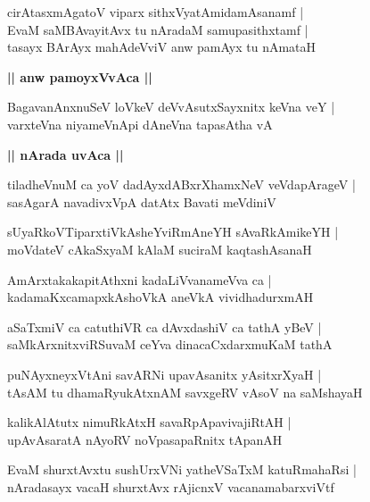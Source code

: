 \documentclass[twoside,12pt,openright]{book}
\newcounter{shloka}[chapter]
\def\uvaca#1{\centerline{{\large\textbf{#1}}}}
\begin{document}
\begin{shloka}
cirAtasxmAgatoV viparx sithxVyatAmidamAsanamf |\\
EvaM saMBAvayitAvx tu nAradaM samupasithxtamf |\\
tasayx BArAyx mahAdeVviV anw pamAyx tu nAmataH 
\end{shloka}

\uvaca{|| anw pamoyxVvAca ||}

\begin{shloka}
BagavanAnxnuSeV loVkeV deVvAsutxSayxnitx keVna veY |\\
varxteVna niyameVnApi dAneVna tapasAtha vA
\end{shloka}

\uvaca{|| nArada uvAca ||}

\begin{shloka}
tiladheVnuM ca yoV dadAyxdABxrXhamxNeV veVdapArageV |\\
sasAgarA navadivxVpA datAtx Bavati meVdiniV 
\end{shloka}

\begin{shloka}
sUyaRkoVTiparxtiVkAsheYviRmAneYH sAvaRkAmikeYH |\\
moVdateV cAkaSxyaM kAlaM suciraM kaqtashAsanaH
\end{shloka}

\begin{shloka}
AmArxtakakapitAthxni kadaLiVvanameVva ca |\\
kadamaKxcamapxkAshoVkA aneVkA vividhadurxmAH 
\end{shloka}

\begin{shloka}
aSaTxmiV ca catuthiVR ca dAvxdashiV ca tathA yBeV |\\
saMkArxnitxviRSuvaM ceYva dinacaCxdarxmuKaM tathA
\end{shloka}

\begin{shloka}
puNAyxneyxVtAni savARNi upavAsanitx yAsitxrXyaH |\\
tAsAM tu dhamaRyukAtxnAM savxgeRV vAsoV na saMshayaH 
\end{shloka}

\begin{shloka}
kalikAlAtutx nimuRkAtxH savaRpApavivajiRtAH |\\
upAvAsaratA nAyoRV noVpasapaRnitx tApanAH
\end{shloka}

\begin{shloka}
EvaM shurxtAvxtu sushUrxVNi yatheVSaTxM katuRmahaRsi |\\
nAradasayx vacaH shurxtAvx rAjicnxV vacanamabarxviVtf
\end{shloka}
\end{document}
